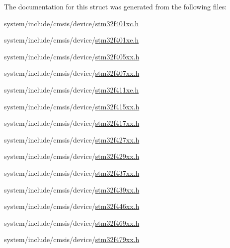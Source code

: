 The documentation for this struct was generated from the following files\+:\begin{DoxyCompactItemize}
\item 
system/include/cmsis/device/\hyperlink{stm32f401xc_8h}{stm32f401xc.\+h}\item 
system/include/cmsis/device/\hyperlink{stm32f401xe_8h}{stm32f401xe.\+h}\item 
system/include/cmsis/device/\hyperlink{stm32f405xx_8h}{stm32f405xx.\+h}\item 
system/include/cmsis/device/\hyperlink{stm32f407xx_8h}{stm32f407xx.\+h}\item 
system/include/cmsis/device/\hyperlink{stm32f411xe_8h}{stm32f411xe.\+h}\item 
system/include/cmsis/device/\hyperlink{stm32f415xx_8h}{stm32f415xx.\+h}\item 
system/include/cmsis/device/\hyperlink{stm32f417xx_8h}{stm32f417xx.\+h}\item 
system/include/cmsis/device/\hyperlink{stm32f427xx_8h}{stm32f427xx.\+h}\item 
system/include/cmsis/device/\hyperlink{stm32f429xx_8h}{stm32f429xx.\+h}\item 
system/include/cmsis/device/\hyperlink{stm32f437xx_8h}{stm32f437xx.\+h}\item 
system/include/cmsis/device/\hyperlink{stm32f439xx_8h}{stm32f439xx.\+h}\item 
system/include/cmsis/device/\hyperlink{stm32f446xx_8h}{stm32f446xx.\+h}\item 
system/include/cmsis/device/\hyperlink{stm32f469xx_8h}{stm32f469xx.\+h}\item 
system/include/cmsis/device/\hyperlink{stm32f479xx_8h}{stm32f479xx.\+h}\end{DoxyCompactItemize}
